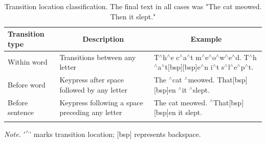 \documentclass[
  man,floatsintext]{apa7}
\begin{document}
\begin{table}[tbp]

\begin{center}
\begin{threeparttable}

\caption{\label{tab:keyloc}Transition location classification. The final text in all cases was "The cat meowed. Then it slept."}

\footnotesize{

\begin{tabular}{p{3cm}p{5cm}p{6cm}}
\toprule
Transition type & \multicolumn{1}{c}{Description} & \multicolumn{1}{c}{Example}\\
\midrule
Within word & Transitions between any letter & T$^{\wedge}$h$^{\wedge}$e c$^{\wedge}$a$^{\wedge}$t m$^{\wedge}$e$^{\wedge}$o$^{\wedge}$w$^{\wedge}$e$^{\wedge}$d. T$^{\wedge}$h$^{\wedge}$a$^{\wedge}$t[bsp][bsp]e$^{\wedge}$n i$^{\wedge}$t s$^{\wedge}$l$^{\wedge}$e$^{\wedge}$p$^{\wedge}$t.\\
Before word & Keypress after space followed by any letter & The $^{\wedge}$cat $^{\wedge}$meowed. That[bsp][bsp]en $^{\wedge}$it $^{\wedge}$slept.\\
Before sentence & Keypress following a space preceding any letter & The cat meowed. $^{\wedge}$That[bsp][bsp]en it slept.\\
\bottomrule
\addlinespace
\end{tabular}

}

\begin{tablenotes}[para]
\normalsize{\textit{Note.} $'^{\wedge}$' marks transition location; [bsp] represents backspace.}
\end{tablenotes}

\end{threeparttable}
\end{center}

\end{table}
\end{document}
